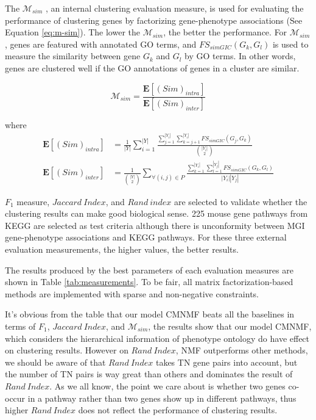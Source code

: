 \documentclass{bmcart}
\begin{document}
The $\mathcal{M}_{sim}$ \cite{Bordino2010}, an internal clustering evaluation measure, is used for evaluating the performance of clustering genes by factorizing gene-phenotype associations (See Equation \ref{eq:m-sim}). The lower the $\mathcal{M}_{sim}$, the better the performance. For $\mathcal{M}_{sim}$, genes are featured with annotated GO terms, and $FS_{simGIC}(G_k,G_l)$ \cite{Teng2013} is used to measure the similarity between gene $G_k$ and $G_l$ by GO terms. In other words, genes are clustered well if the GO annotations of genes in a cluster are similar.

\begin{equation}\label{eq:m-sim}
\mathcal{M}_{sim} = \frac{\bm{E}[(Sim)_{intra}]}{\bm{E}[(Sim)_{inter}]}
\end{equation}

where
\begin{equation}\label{}\nonumber
\begin{split}
\bm{E}[(Sim)_{intra}]&=\frac{1}{|Y|}\sum_{i=1}^{|Y|}
\frac{\sum_{j=1}^{|Y_i|}\sum_{k=j+1}^{|Y_i|}FS_{simGIC}(G_j,G_k)}{{|Y_i|\choose 2}}\\
\bm{E}[(Sim)_{inter}]&=\frac{1}{{|Y|\choose 2}}\sum_{\forall(i,j)\in P}
\frac{\sum_{k=1}^{|Y_i|}\sum_{l=1}^{|Y_j|}FS_{simGIC}(G_k,G_l)}{|Y_i||Y_j|}
\end{split}
\end{equation}

$F_1$ measure, $Jaccard\ Index$, and $Rand\ index$ are selected to validate whether the clustering results can make good biological sense. 225 mouse gene pathways from KEGG are selected as test criteria although there is unconformity between MGI gene-phenotype associations and KEGG pathways. For these three external evaluation measurements, the higher values, the better results.

The results produced by the best parameters of each evaluation measures are shown in Table \ref{tab:measurements}. To be fair, all matrix factorization-based methods are implemented with sparse and non-negative constraints.

It's obvious from the table that our model CMNMF beats all the baselines in terms of $F_1$, $Jaccard\ Index$, and $\mathcal{M}_{sim}$, the results show that our model CMNMF, which considers the hierarchical information of phenotype ontology do have effect on clustering results. However on $Rand\ Index$, NMF outperforms other methods, we should be aware of that $Rand\ Index$ takes TN gene pairs into account, but the number of TN pairs is way great than others and dominates the result of $Rand\ Index$. As we all know, the point we care about is whether two genes co-occur in a pathway rather than two genes show up in different pathways, thus higher $Rand\ Index$ does not reflect the performance of clustering results.
\end{document}
